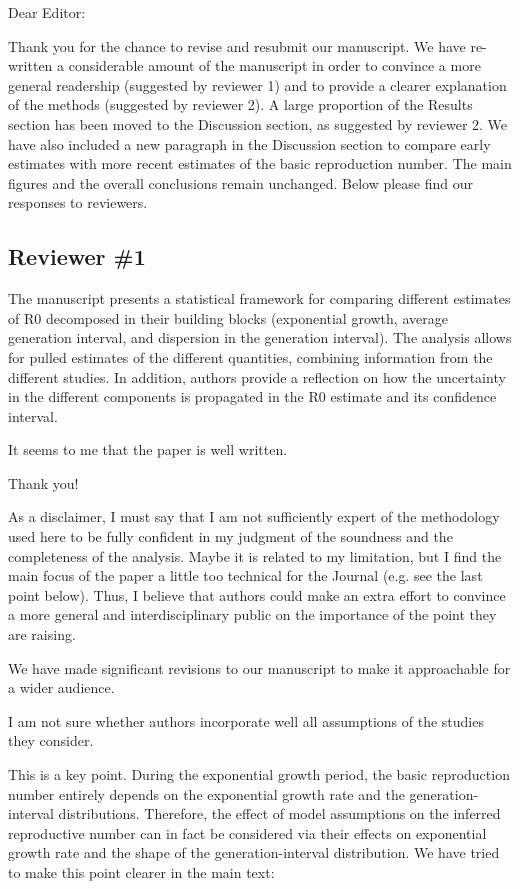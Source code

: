 \documentclass[12pt]{article}
\newcommand{\rev}{\subsection*}
\newcommand{\revtext}{\textsf}
\begin{document}
\noindent Dear Editor:

Thank you for the chance to revise and resubmit our manuscript. 
We have re-written a considerable amount of the manuscript in order to convince a more general readership (suggested by reviewer 1) and to provide a clearer explanation of the methods (suggested by reviewer 2).
A large proportion of the Results section has been moved to the Discussion section, as suggested by reviewer 2.
We have also included a new paragraph in the Discussion section to compare early estimates with more recent estimates of the basic reproduction number.
The main figures and the overall conclusions remain unchanged.
Below please find our responses to reviewers.

\rev{Reviewer \#1}

\revtext{
The manuscript presents a statistical framework for comparing different estimates of R0 decomposed in their building blocks (exponential growth, average generation interval, and dispersion in the generation interval). The analysis allows for pulled estimates of the different quantities, combining information from the different studies. In addition, authors provide a reflection on how the uncertainty in the different components is propagated in the R0 estimate and its confidence interval.}

\revtext{It seems to me that the paper is well written.}

Thank you!

\revtext{As a disclaimer, I must say that I am not sufficiently expert of the methodology used here to be fully confident in my judgment of the soundness and the completeness of the analysis. Maybe it is related to my limitation, but I find the main focus of the paper a little too technical for the Journal (e.g. see the last point below). Thus, I believe that authors could make an extra effort to convince a more general and interdisciplinary public on the importance of the point they are raising.}

We have made significant revisions to our manuscript to make it approachable for a wider audience.

\revtext{I am not sure whether authors incorporate well all assumptions of the studies they consider.} 

This is a key point. During the exponential growth period, the basic reproduction number entirely depends on the exponential growth rate and the generation-interval distributions.
Therefore, the effect of model assumptions on the inferred reproductive number can in fact be considered via their effects on exponential growth rate and the shape of the generation-interval distribution.
We have tried to make this point clearer in the main text:
\end{document}
